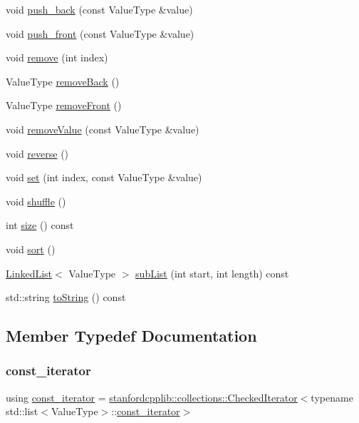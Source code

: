 \begin{DoxyCompactItemize}
void \mbox{\hyperlink{classLinkedList_a8ff6f18ca45e769f2f8c7a0bcf79fad9}{push\+\_\+back}} (const Value\+Type \&value)
\item 
void \mbox{\hyperlink{classLinkedList_a9737dc314198d1cf306325134f000c5a}{push\+\_\+front}} (const Value\+Type \&value)
\item 
void \mbox{\hyperlink{classLinkedList_a2ad1aa316f278b2e9fa8121504749652}{remove}} (int index)
\item 
Value\+Type \mbox{\hyperlink{classLinkedList_af7878e9c2f67e06cbae525e9fa77e38e}{remove\+Back}} ()
\item 
Value\+Type \mbox{\hyperlink{classLinkedList_a02453aa96e93c38ca4c1d176307c8a63}{remove\+Front}} ()
\item 
void \mbox{\hyperlink{classLinkedList_a10e8154a489093d2b1f20596342bcd78}{remove\+Value}} (const Value\+Type \&value)
\item 
void \mbox{\hyperlink{classLinkedList_a310c0bebc002158f5646a91d60e4dc89}{reverse}} ()
\item 
void \mbox{\hyperlink{classLinkedList_a004ea6d6bc4a512ce4d52962727d5db2}{set}} (int index, const Value\+Type \&value)
\item 
void \mbox{\hyperlink{classLinkedList_a1905fe84eb39f020b32c58baf7a76758}{shuffle}} ()
\item 
int \mbox{\hyperlink{classLinkedList_af9593d4a5ff4274efaf429cb4f9e57cc}{size}} () const
\item 
void \mbox{\hyperlink{classLinkedList_a47fdc9eea42b6975cdc835bb2e08810e}{sort}} ()
\item 
\mbox{\hyperlink{classLinkedList}{Linked\+List}}$<$ Value\+Type $>$ \mbox{\hyperlink{classLinkedList_a1524b4e899bf6d7b9db87243f3be0c1b}{sub\+List}} (int start, int length) const
\item 
std\+::string \mbox{\hyperlink{classLinkedList_a1fe5121d6528fdea3f243321b3fa3a49}{to\+String}} () const
\end{DoxyCompactItemize}


\subsection{Member Typedef Documentation}
\mbox{\label{classLinkedList_a3b9d37bc4aeea14213d403a3b30a230f}} 
\subsubsection{\texorpdfstring{const\+\_\+iterator}{const\_iterator}}
{\footnotesize\ttfamily using \mbox{\hyperlink{classLinkedList_a3b9d37bc4aeea14213d403a3b30a230f}{const\+\_\+iterator}} =  \mbox{\hyperlink{classstanfordcpplib_1_1collections_1_1CheckedIterator}{stanfordcpplib\+::collections\+::\+Checked\+Iterator}}$<$typename std\+::list$<$Value\+Type$>$\+::\mbox{\hyperlink{classLinkedList_a3b9d37bc4aeea14213d403a3b30a230f}{const\+\_\+iterator}}$>$}

